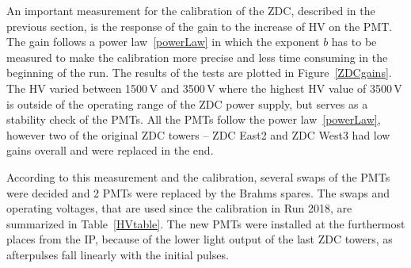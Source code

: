 An important measurement for the calibration of the ZDC, described in the previous section, is the response of the gain to the increase of HV on the PMT\@. The gain follows a power law~\eqref{powerLaw} in which the exponent $b$ has to be measured to make the calibration more precise and less time consuming in the beginning of the run. The results of the tests are plotted in Figure~\ref{ZDCgains}\@. The HV varied between 1500$\,$V and 3500$\,$V where the highest HV value of 3500$\,$V is outside of the operating range of the ZDC power supply, but serves as a stability check of the PMTs. All the PMTs follow the power law~\eqref{powerLaw}, however two of the original ZDC towers -- ZDC East2 and ZDC West3 had low gains overall and were replaced in the end. 

According to this measurement and the calibration, several swaps of the PMTs were decided and 2 PMTs were replaced by the Brahms spares. The swaps and operating voltages, that are used since the calibration in Run 2018, are summarized in Table~\ref{HVtable}\@. The new PMTs were installed at the furthermost places from the IP, because of the lower light output of the last ZDC towers, as afterpulses fall linearly with the initial pulses. 


